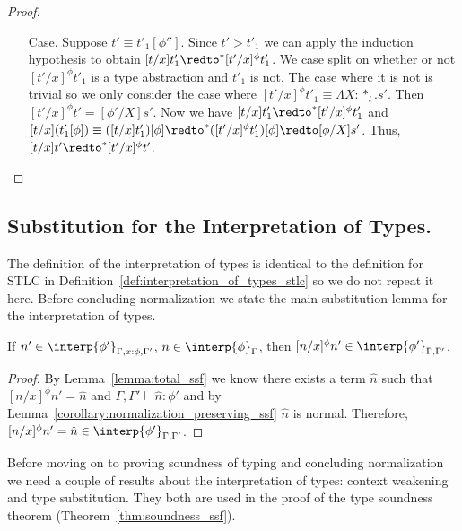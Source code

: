 \begin{proof}
\begin{itemize}
\item[Case.] Suppose $t' \equiv t'_1[\phi'']$.
  Since $t' > t'_1$ we can apply the induction hypothesis to
  obtain $[t/x] t'_1 \redto^* [t'/x]^\phi t'_1$.  We case split on whether or not $[t'/x]^\phi t'_1$ is
  a type abstraction and $t'_1$ is not.  The case where it is not is trivial so we only consider
  the case where $[t'/x]^\phi t'_1 \equiv \Lambda X:*_l.s'$.  Then 
  $[t'/x]^\phi t'  = [\phi'/X]s'$.  Now we have $[t/x] t'_1 \redto^* [t'/x]^\phi t'_1$ and
  $[t/x](t'_1[\phi]) \equiv ([t/x]t'_1)[\phi] \redto^* ([t'/x]^\phi t'_1)[\phi] \redto [\phi/X]s'$.  Thus,
  $[t/x]t' \redto^* [t'/x]^\phi t'$.  
\end{itemize}
\end{proof}

\subsection{Substitution for the Interpretation of Types.}
\label{subsec:substitution_for_the_interpretation_of_types_ssf}
The definition of the interpretation of types is identical to the
definition for STLC in Definition~\ref{def:interpretation_of_types_stlc}
so we do not repeat it here.  Before concluding normalization we state
the main substitution lemma for the interpretation of types.
\begin{lemma}
  If $n' \in \interp{\phi'}_{\Gamma,x:\phi,\Gamma'}$, $n \in \interp{\phi}_\Gamma$, then 
  $[n/x]^\phi n' \in \interp{\phi'}_{\Gamma,\Gamma'}$.
  
  \label{lemma:interpretation_of_types_closed_substitution_ssf}
\end{lemma}
\begin{proof}
  By Lemma~\ref{lemma:total_ssf} we know there exists a term $\hat{n}$ 
  such that $[n/x]^\phi n' = \hat{n}$ and $\Gamma,\Gamma' \vdash \hat{n}:\phi'$ and by 
  Lemma~\ref{corollary:normalization_preserving_ssf} $\hat{n}$ is normal.  Therefore,
  $[n/x]^\phi n' = \hat{n} \in \interp{\phi'}_{\Gamma,\Gamma'}$.
\end{proof}

Before moving on to proving soundness of typing and concluding
normalization we need a couple of results about the interpretation of
types: context weakening and type substitution.  They both are used in
the proof of the type soundness theorem
(Theorem~\ref{thm:soundness_ssf}).

